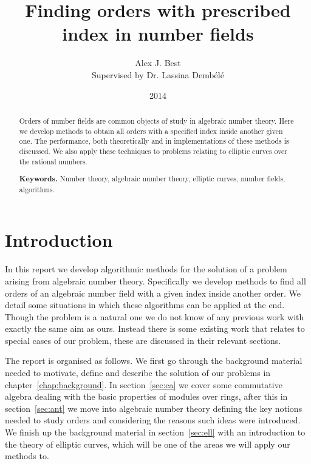 \documentclass[12pt,a4paper,abstracton,bibtotoc]{scrreprt}
\author{Alex J. Best \\ Supervised by Dr. Lassina Demb\'el\'e}
\date{2014}
\title{Finding orders with prescribed index in number fields}
\theoremstyle{definition}
\begin{document}
\maketitle
\newpage\null\thispagestyle{empty}\newpage

\begin{abstract}
Orders of number fields are common objects of study in algebraic number theory.
Here we develop methods to obtain all orders with a specified index inside another given one.
The performance, both theoretically and in implementations of these methods is discussed.
We also apply these techniques to problems relating to elliptic curves over the rational numbers.

\smallskip
\noindent \textbf{Keywords.} Number theory, algebraic number theory, elliptic curves, number fields, algorithms.
\end{abstract}

\newpage\null\thispagestyle{empty}\newpage

\tableofcontents

\chapter{Introduction}
In this report we develop algorithmic methods for the solution of a problem arising from algebraic number theory.
Specifically we develop methods to find all orders of an algebraic number field with a given index inside another order.
We detail some situations in which these algorithms can be applied at the end.
Though the problem is a natural one we do not know of any previous work with exactly the same aim as ours.
Instead there is some existing work that relates to special cases of our problem, these are discussed in their relevant sections.

The report is organised as follows.
We first go through the background material needed to motivate, define and describe the solution of our problems in chapter~\ref{chap:background}.
In section~\ref{sec:ca} we cover some commutative algebra dealing with the basic properties of modules over rings, after this in section~\ref{sec:ant} we move into algebraic number theory defining the key notions needed to study orders and considering the reasons such ideas were introduced.
We finish up the background material in section~\ref{sec:ell} with an introduction to the theory of elliptic curves, which will be one of the areas we will apply our methods to.
\end{document}
